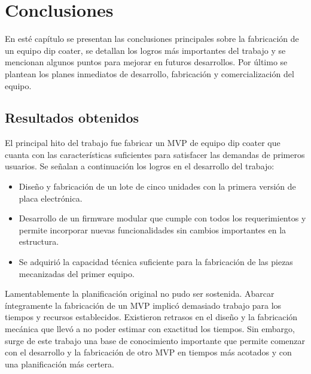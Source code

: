 
\chapter{Conclusiones} %

\label{Chapter5} %



En esté capítulo se presentan las conclusiones principales sobre la fabricación de un equipo dip coater, se detallan los logros más importantes del trabajo y se mencionan algunos puntos para mejorar en futuros desarrollos. Por último se plantean los planes inmediatos de desarrollo, fabricación y comercialización del equipo.

\section{Resultados obtenidos }


El principal hito del trabajo fue fabricar un MVP de equipo dip coater que cuanta con las características suficientes para satisfacer las demandas de primeros usuarios. 
Se señalan a continuación los logros en el desarrollo del trabajo: 
\begin{itemize}
\item Diseño y fabricación de un lote de cinco unidades con la primera versión de placa electrónica.
\item Desarrollo de un firmware modular que cumple con todos los requerimientos y permite incorporar nuevas funcionalidades sin cambios importantes en la estructura.
\item Se adquirió la capacidad técnica suficiente para la fabricación de las piezas mecanizadas del primer equipo.  
\end{itemize} 
 

Lamentablemente la planificación original no pudo ser sostenida. Abarcar íntegramente la fabricación de un MVP implicó demasiado trabajo para los tiempos y recursos establecidos. Existieron retrasos en el diseño y la fabricación mecánica que llevó a no poder estimar con exactitud los tiempos. Sin embargo, surge de este trabajo una base de conocimiento importante que permite comenzar con el desarrollo y la fabricación de otro MVP en tiempos más acotados y con una planificación más certera. 



